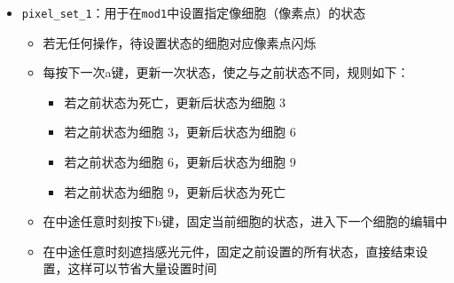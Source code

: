\documentclass[11pt]{article}
\providecommand{\tightlist}{%
      \setlength{\itemsep}{0pt}\setlength{\parskip}{0pt}}
\begin{document}
    \begin{itemize}
\tightlist
\item
  \texttt{pixel\_set\_1}：用于在\texttt{mod1}中设置指定像细胞（像素点）的状态

  \begin{itemize}
  \tightlist
  \item
    若无任何操作，待设置状态的细胞对应像素点闪烁
  \item
    每按下一次a键，更新一次状态，使之与之前状态不同，规则如下：

    \begin{itemize}
    \tightlist
    \item
      若之前状态为死亡，更新后状态为细胞 3
    \item
      若之前状态为细胞 3，更新后状态为细胞 6
    \item
      若之前状态为细胞 6，更新后状态为细胞 9
    \item
      若之前状态为细胞 9，更新后状态为死亡
    \end{itemize}
  \item
    在中途任意时刻按下b键，固定当前细胞的状态，进入下一个细胞的编辑中
  \item
    在中途任意时刻遮挡感光元件，固定之前设置的所有状态，直接结束设置，这样可以节省大量设置时间
  \end{itemize}
\end{itemize}
\end{document}
